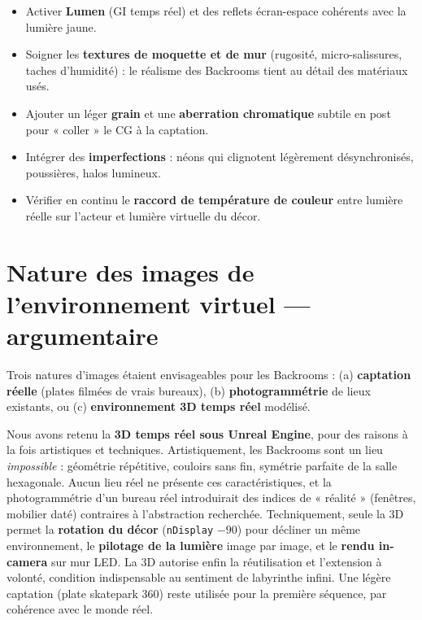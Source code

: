 \documentclass[11pt,a4paper]{report}
\begin{document}
\begin{infobox}[title={Conseils pour améliorer le photoréalisme du rendu}]
\begin{itemize}
\item Activer \textbf{Lumen} (GI temps réel) et des reflets écran-espace cohérents avec la lumière jaune.
\item Soigner les \textbf{textures de moquette et de mur} (rugosité, micro-salissures, taches d'humidité) : le réalisme des Backrooms tient au détail des matériaux usés.
\item Ajouter un léger \textbf{grain} et une \textbf{aberration chromatique} subtile en post pour « coller » le CG à la captation.
\item Intégrer des \textbf{imperfections} : néons qui clignotent légèrement désynchronisés, poussières, halos lumineux.
\item Vérifier en continu le \textbf{raccord de température de couleur} entre lumière réelle sur l'acteur et lumière virtuelle du décor.
\end{itemize}
\end{infobox}

\section{Nature des images de l'environnement virtuel --- argumentaire}
Trois natures d'images étaient envisageables pour les Backrooms : (a) \textbf{captation réelle} (plates filmées de vrais bureaux), (b) \textbf{photogrammétrie} de lieux existants, ou (c) \textbf{environnement 3D temps réel} modélisé.

Nous avons retenu la \textbf{3D temps réel sous Unreal Engine}, pour des raisons à la fois artistiques et techniques. Artistiquement, les Backrooms sont un lieu \emph{impossible} : géométrie répétitive, couloirs sans fin, symétrie parfaite de la salle hexagonale. Aucun lieu réel ne présente ces caractéristiques, et la photogrammétrie d'un bureau réel introduirait des indices de « réalité » (fenêtres, mobilier daté) contraires à l'abstraction recherchée. Techniquement, seule la 3D permet la \textbf{rotation du décor} (\texttt{nDisplay} $-90$\textdegree) pour décliner un même environnement, le \textbf{pilotage de la lumière} image par image, et le \textbf{rendu in-camera} sur mur LED. La 3D autorise enfin la réutilisation et l'extension à volonté, condition indispensable au sentiment de labyrinthe infini. Une légère captation (plate skatepark 360\textdegree) reste utilisée pour la première séquence, par cohérence avec le monde réel.
\end{document}
